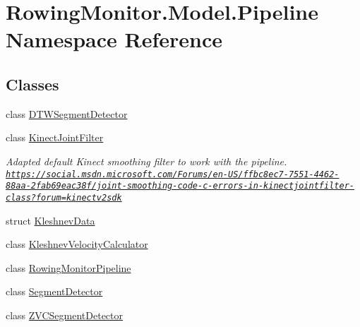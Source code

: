 \hypertarget{namespace_rowing_monitor_1_1_model_1_1_pipeline}{}\section{Rowing\+Monitor.\+Model.\+Pipeline Namespace Reference}
\label{namespace_rowing_monitor_1_1_model_1_1_pipeline}
\subsection*{Classes}
\begin{DoxyCompactItemize}
\item 
class \hyperlink{class_rowing_monitor_1_1_model_1_1_pipeline_1_1_d_t_w_segment_detector}{D\+T\+W\+Segment\+Detector}
\item 
class \hyperlink{class_rowing_monitor_1_1_model_1_1_pipeline_1_1_kinect_joint_filter}{Kinect\+Joint\+Filter}
\begin{DoxyCompactList}\small\item\em Adapted default Kinect smoothing filter to work with the pipeline. \href{https://social.msdn.microsoft.com/Forums/en-US/ffbc8ec7-7551-4462-88aa-2fab69eac38f/joint-smoothing-code-c-errors-in-kinectjointfilter-class?forum=kinectv2sdk}{\tt https\+://social.\+msdn.\+microsoft.\+com/\+Forums/en-\/\+U\+S/ffbc8ec7-\/7551-\/4462-\/88aa-\/2fab69eac38f/joint-\/smoothing-\/code-\/c-\/errors-\/in-\/kinectjointfilter-\/class?forum=kinectv2sdk} \end{DoxyCompactList}\item 
struct \hyperlink{struct_rowing_monitor_1_1_model_1_1_pipeline_1_1_kleshnev_data}{Kleshnev\+Data}
\item 
class \hyperlink{class_rowing_monitor_1_1_model_1_1_pipeline_1_1_kleshnev_velocity_calculator}{Kleshnev\+Velocity\+Calculator}
\item 
class \hyperlink{class_rowing_monitor_1_1_model_1_1_pipeline_1_1_rowing_monitor_pipeline}{Rowing\+Monitor\+Pipeline}
\item 
class \hyperlink{class_rowing_monitor_1_1_model_1_1_pipeline_1_1_segment_detector}{Segment\+Detector}
\item 
class \hyperlink{class_rowing_monitor_1_1_model_1_1_pipeline_1_1_z_v_c_segment_detector}{Z\+V\+C\+Segment\+Detector}
\end{DoxyCompactItemize}
